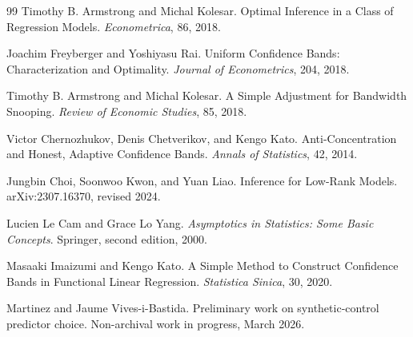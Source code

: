 \documentclass{article}
\begin{document}
\begin{thebibliography}{99}
   Timothy B. Armstrong and Michal Kolesar. Optimal Inference in a Class of Regression Models. \emph{Econometrica}, 86, 2018.

   Joachim Freyberger and Yoshiyasu Rai. Uniform Confidence Bands: Characterization and Optimality. \emph{Journal of Econometrics}, 204, 2018.

   Timothy B. Armstrong and Michal Kolesar. A Simple Adjustment for Bandwidth Snooping. \emph{Review of Economic Studies}, 85, 2018.

   Victor Chernozhukov, Denis Chetverikov, and Kengo Kato. Anti-Concentration and Honest, Adaptive Confidence Bands. \emph{Annals of Statistics}, 42, 2014.

   Jungbin Choi, Soonwoo Kwon, and Yuan Liao. Inference for Low-Rank Models. arXiv:2307.16370, revised 2024.

   Lucien Le Cam and Grace Lo Yang. \emph{Asymptotics in Statistics: Some Basic Concepts}. Springer, second edition, 2000.

   Masaaki Imaizumi and Kengo Kato. A Simple Method to Construct Confidence Bands in Functional Linear Regression. \emph{Statistica Sinica}, 30, 2020.

   Martinez and Jaume Vives-i-Bastida. Preliminary work on synthetic-control predictor choice. Non-archival work in progress, March 2026.

\end{thebibliography}
\end{document}
